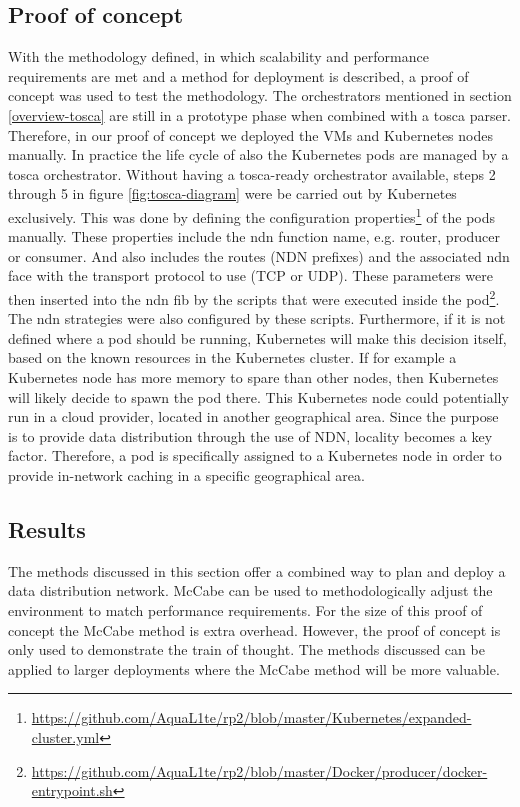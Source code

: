 \subsection{Proof of concept}
\label{planning-poc}
With the methodology defined, in which scalability and performance requirements are met and a method for deployment is described, a proof of concept was used to test the methodology. The orchestrators mentioned in section \ref{overview-tosca} are still in a prototype phase when combined with a \gls{tosca} parser. Therefore, in our proof of concept we deployed the VMs and Kubernetes nodes manually. In practice the life cycle of also the Kubernetes pods are managed by a \gls{tosca} orchestrator. Without having a \gls{tosca}-ready orchestrator available, steps 2 through 5 in figure \ref{fig:tosca-diagram} were be carried out by Kubernetes exclusively. This was done by defining the configuration properties\footnote{\url{https://github.com/AquaL1te/rp2/blob/master/Kubernetes/expanded-cluster.yml}} of the pods manually. These properties include the \gls{ndn} function name, e.g. router, producer or consumer. And also includes the routes (NDN prefixes) and the associated \gls{ndn} face with the transport protocol to use (TCP or UDP). These parameters were then inserted into the \gls{ndn} \gls{fib} by the scripts that were executed inside the pod\footnote{\url{https://github.com/AquaL1te/rp2/blob/master/Docker/producer/docker-entrypoint.sh}}. The \gls{ndn} strategies were also configured by these scripts. Furthermore, if it is not defined where a pod should be running, Kubernetes will make this decision itself, based on the known resources in the Kubernetes cluster. If for example a Kubernetes node has more memory to spare than other nodes, then Kubernetes will likely decide to spawn the pod there. This Kubernetes node could potentially run in a cloud provider, located in another geographical area. Since the purpose is to provide data distribution through the use of NDN, locality becomes a key factor. Therefore, a pod is specifically assigned to a Kubernetes node in order to provide in-network caching in a specific geographical area.

\subsection{Results}
The methods discussed in this section offer a combined way to plan and deploy a data distribution network. McCabe can be used to methodologically adjust the environment to match performance requirements. For the size of this proof of concept the McCabe method is extra overhead. However, the proof of concept is only used to demonstrate the train of thought. The methods discussed can be applied to larger deployments where the McCabe method will be more valuable.

